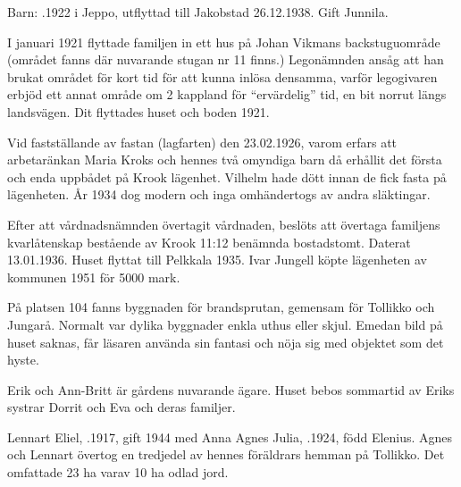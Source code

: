 Barn:  .1922 i Jeppo, utflyttad till Jakobstad 26.12.1938. Gift Junnila.

I januari 1921 flyttade familjen in ett hus på Johan Vikmans backstuguområde (området fanns där nuvarande stugan nr 11 	finns.) Legonämnden ansåg att han brukat området för kort tid för att kunna inlösa densamma, varför legogivaren erbjöd ett annat område om 2 kappland för ``ervärdelig'' tid, en bit norrut längs landsvägen. Dit flyttades huset och boden 1921.

Vid fastställande av fastan (lagfarten) den 23.02.1926, varom erfars att arbetaränkan Maria Kroks och hennes två omyndiga barn då erhållit det första och enda uppbådet på Krook lägenhet. Vilhelm hade dött innan de fick fasta på lägenheten. År 1934 dog modern och inga omhändertogs av andra släktingar.

Efter att vårdnadsnämnden övertagit vårdnaden, beslöts att övertaga familjens kvarlåtenskap bestående av Krook 11:12 benämnda bostadstomt. Daterat 13.01.1936. Huset flyttat till Pelkkala 1935. Ivar Jungell köpte lägenheten av kommunen 1951 för 5000 mark.



%

\jhnooccupant{}
På platsen 104 fanns byggnaden för brandsprutan, gemensam för Tollikko och Jungarå. Normalt var dylika byggnader enkla uthus eller skjul. Emedan bild på huset saknas, får läsaren använda sin fantasi och nöja sig med objektet som det hyste.\jhvspace{}




%

%
Erik och Ann-Britt är gårdens nuvarande ägare. Huset bebos sommartid av Eriks systrar Dorrit och Eva och deras familjer.\jhvspace{}



%
Lennart Eliel, .1917, gift 1944 med Anna Agnes Julia, .1924, född Elenius. Agnes och Lennart övertog en tredjedel av hennes föräldrars hemman på Tollikko. Det omfattade 23 ha varav 10 ha odlad jord.
\begin{jhchildren}
  \item {}
  \item {}
  \item {}
\end{jhchildren}

